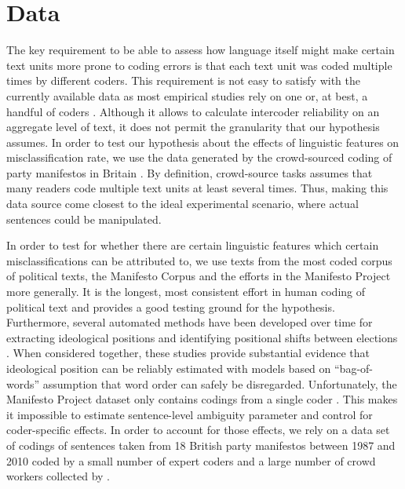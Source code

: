 \documentclass[a4paper, 12pt]{article}
\begin{document}
\section{Data}

The key requirement to be able to assess how language itself might make certain text units more prone to coding errors is that each text unit was coded multiple times by different coders. This requirement is not easy to satisfy with the currently available data as most empirical studies rely on one or, at best, a handful of coders \citep[e.g.][]{VLM+2016,Dolezal2016a}. Although it allows to calculate intercoder reliability on an aggregate level of text, it does not permit the granularity that our hypothesis assumes. In order to test our hypothesis about the effects of linguistic features on misclassification rate, we use the data generated by the crowd-sourced coding of party manifestos in Britain \citep{Benoit2016}. By definition, crowd-source tasks assumes that many readers code multiple text units at least several times. Thus, making this data source come closest to the ideal experimental scenario, where actual sentences could be manipulated.

In order to test for whether there are certain linguistic features which certain misclassifications can be attributed to, we use texts from the most coded corpus of political texts, the Manifesto Corpus \citep{MRL2016-04} and the efforts in the Manifesto Project \citep{VLM+2016} more generally. It is the longest, most consistent effort in human coding of political text and provides a good testing ground for the hypothesis. Furthermore, several automated methods have been developed over time for extracting ideological positions and identifying positional shifts between elections \citep{Laver2003, Slapin2008, Lo2016}. When considered together, these studies provide substantial evidence that ideological position can be reliably estimated with models based on \enquote{bag-of-words} assumption that word order can safely be disregarded.  Unfortunately, the Manifesto Project dataset only contains codings from a single coder \citep{Mikhaylov2012}. This makes it impossible to estimate sentence-level ambiguity parameter and control for coder-specific effects. In order to account for those effects, we rely on a data set of codings of sentences taken from 18 British party manifestos between 1987 and 2010 coded by a small number of expert coders and a large number of crowd workers collected by \citet{Benoit2016}.
\end{document}

